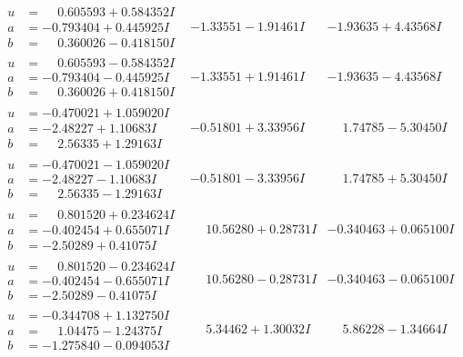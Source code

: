 \documentclass[1p]{elsarticle_modified}
\theoremstyle{definition}
\begin{document}
$$\begin{array}{c|c|c}
\begin{aligned}
u &= \phantom{-}0.605593 + 0.584352 I \\
a &= -0.793404 + 0.445925 I \\
b &= \phantom{-}0.360026 - 0.418150 I\end{aligned}
 & -1.33551 - 1.91461 I & -1.93635 + 4.43568 I \\ \hline\begin{aligned}
u &= \phantom{-}0.605593 - 0.584352 I \\
a &= -0.793404 - 0.445925 I \\
b &= \phantom{-}0.360026 + 0.418150 I\end{aligned}
 & -1.33551 + 1.91461 I & -1.93635 - 4.43568 I \\ \hline\begin{aligned}
u &= -0.470021 + 1.059020 I \\
a &= -2.48227 + 1.10683 I \\
b &= \phantom{-}2.56335 + 1.29163 I\end{aligned}
 & -0.51801 + 3.33956 I & \phantom{-}1.74785 - 5.30450 I \\ \hline\begin{aligned}
u &= -0.470021 - 1.059020 I \\
a &= -2.48227 - 1.10683 I \\
b &= \phantom{-}2.56335 - 1.29163 I\end{aligned}
 & -0.51801 - 3.33956 I & \phantom{-}1.74785 + 5.30450 I \\ \hline\begin{aligned}
u &= \phantom{-}0.801520 + 0.234624 I \\
a &= -0.402454 + 0.655071 I \\
b &= -2.50289 + 0.41075 I\end{aligned}
 & \phantom{-}10.56280 + 0.28731 I & -0.340463 + 0.065100 I \\ \hline\begin{aligned}
u &= \phantom{-}0.801520 - 0.234624 I \\
a &= -0.402454 - 0.655071 I \\
b &= -2.50289 - 0.41075 I\end{aligned}
 & \phantom{-}10.56280 - 0.28731 I & -0.340463 - 0.065100 I \\ \hline\begin{aligned}
u &= -0.344708 + 1.132750 I \\
a &= \phantom{-}1.04475 - 1.24375 I \\
b &= -1.275840 - 0.094053 I\end{aligned}
 & \phantom{-}5.34462 + 1.30032 I & \phantom{-}5.86228 - 1.34664 I \\ \hline\begin{aligned}

\end{aligned}
\end{array}$$
\end{document}

